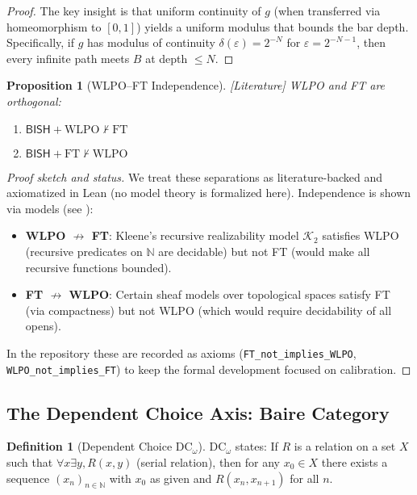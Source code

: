 \documentclass[11pt]{article}
\theoremstyle{plain}
\newtheorem{proposition}[theorem]{Proposition}
\theoremstyle{definition}
\newtheorem{definition}[theorem]{Definition}
\newcommand{\N}{\mathbb{N}}
\newcommand{\WLPO}{\mathrm{WLPO}}
\newcommand{\FT}{\mathrm{FT}}
\newcommand{\DCw}{\mathrm{DC}_\omega}
\newcommand{\BISH}{\mathsf{BISH}}
\newcommand{\leancited}{\textsf{\textcolor{blue!70!black}{[Literature]}}}
\begin{document}
\begin{proof}
The key insight is that uniform continuity of $g$ (when transferred via homeomorphism to $[0,1]$) yields a uniform modulus that bounds the bar depth. Specifically, if $g$ has modulus of continuity $\delta(\varepsilon) = 2^{-N}$ for $\varepsilon = 2^{-N-1}$, then every infinite path meets $B$ at depth $\leq N$.
\end{proof}

\begin{proposition}[WLPO–FT Independence]\label{prop:orthogonal} \leancited
WLPO and FT are orthogonal:
\begin{enumerate}
\item $\BISH + \WLPO \not\vdash \FT$
\item $\BISH + \FT \not\vdash \WLPO$
\end{enumerate}
\end{proposition}

\begin{proof}[Proof sketch and status]
We treat these separations as literature-backed and axiomatized in Lean (no model theory is formalized here).
Independence is shown via models (see \cite{vanDalen1997, Beeson1985}):
\begin{itemize}
\item \textbf{WLPO $\not\rightarrow$ FT}: Kleene's recursive realizability model $\mathcal{K}_2$ satisfies WLPO (recursive predicates on $\N$ are decidable) but not FT (would make all recursive functions bounded).
\item \textbf{FT $\not\rightarrow$ WLPO}: Certain sheaf models over topological spaces satisfy FT (via compactness) but not WLPO (which would require decidability of all opens).
\end{itemize}
In the repository these are recorded as axioms (\texttt{FT\_not\_implies\_WLPO}, \texttt{WLPO\_not\_implies\_FT}) to keep the formal development focused on calibration.
\end{proof}

\subsection{The Dependent Choice Axis: Baire Category}

\begin{definition}[Dependent Choice $\DCw$]\label{def:dcw}
$\DCw$ states: If $R$ is a relation on a set $X$ such that $\forall x \exists y, R(x,y)$ (serial relation), then for any $x_0 \in X$ there exists a sequence $(x_n)_{n \in \N}$ with $x_0$ as given and $R(x_n, x_{n+1})$ for all $n$.
\end{definition}
\end{document}
